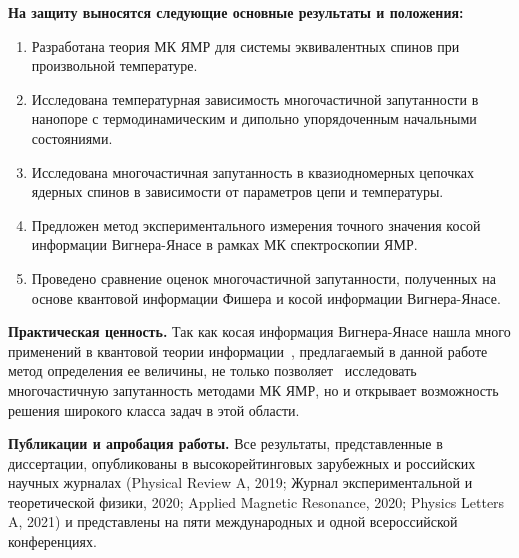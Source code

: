 \textbf{На защиту выносятся следующие основные результаты и положения:}
\begin{enumerate}
  \item Разработана теория МК ЯМР для системы эквивалентных спинов при произвольной температуре.
  \item Исследована температурная зависимость многочастичной запутанности в нанопоре с термодинамическим и дипольно упорядоченным начальными состояниями.
  \item Исследована многочастичная запутанность в квазиодномерных цепочках ядерных спинов в зависимости от параметров цепи и температуры.
  \item Предложен метод экспериментального измерения точного значения косой информации Вигнера-Янасе в рамках МК спектроскопии ЯМР.
  \item Проведено сравнение оценок многочастичной запутанности, полученных на основе квантовой информации Фишера и косой информации Вигнера-Янасе.
\end{enumerate}

\textbf{Практическая ценность.}
Так как косая информация Вигнера-Янасе нашла много применений в квантовой теории информации~\cite{Wigner1963, Luo2017},
предлагаемый в данной работе метод определения ее величины,
не только позволяет~\cite{Doronin2021} исследовать многочастичную запутанность методами МК ЯМР,
но и открывает возможность решения широкого класса задач в этой области.


\textbf{Публикации и апробация работы.}
Все результаты, представленные в диссертации,
опубликованы в высокорейтинговых зарубежных и российских научных журналах (Physical Review A, 2019;  Журнал экспериментальной и теоретической физики, 2020; Applied Magnetic Resonance, 2020; Physics Letters A, 2021) и представлены на пяти международных и одной всероссийской конференциях.



%

